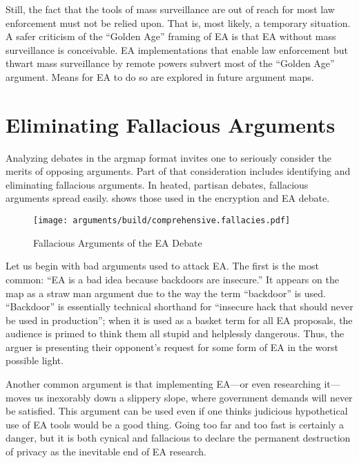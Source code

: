 Still, the fact that the tools of mass surveillance are out of reach for most law enforcement must not be relied upon.
That is, most likely, a temporary situation. A safer criticism of the ``Golden Age'' framing of \ac{EA} is that \ac{EA}
without mass surveillance is conceivable. \ac{EA} implementations that enable law enforcement but thwart mass
surveillance by remote powers subvert most of the ``Golden Age'' argument. Means for \ac{EA} to do so are explored in
future argument maps.


\section{Eliminating Fallacious Arguments}

Analyzing debates in the \ac{argmap} format invites one to seriously consider the merits of opposing arguments. Part of
that consideration includes identifying and eliminating fallacious arguments. In heated, partisan debates, fallacious
arguments spread easily.  shows those used in the encryption and \ac{EA} debate.

\begin{figure}[t!]
  \centering\CaptionFontSize
  \texttt{[image: arguments/build/comprehensive.fallacies.pdf]}
  \caption{Fallacious Arguments of the EA Debate}
  \label{fig-arg-fallacies}
\end{figure}

Let us begin with bad arguments used to attack \ac{EA}. The first is the most common: ``\ac{EA} is a bad idea because
backdoors are insecure.'' It appears on the map as a straw man argument due to the way the term ``backdoor'' is used.
``Backdoor'' is essentially technical shorthand for ``insecure hack that should never be used in production''; when it
is used as a basket term for all \ac{EA} proposals, the audience is primed to think them all stupid and helplessly
dangerous. Thus, the arguer is presenting their opponent's request for some form of \ac{EA} in the worst possible light.

Another common argument is that implementing \ac{EA}---or even researching it---moves us inexorably down a slippery
slope, where government demands will never be satisfied. This argument can be used even if one thinks judicious
hypothetical use of \ac{EA} tools would be a good thing. Going too far and too fast is certainly a danger, but it is
both cynical and fallacious to declare the permanent destruction of privacy as the inevitable end of \ac{EA} research.

